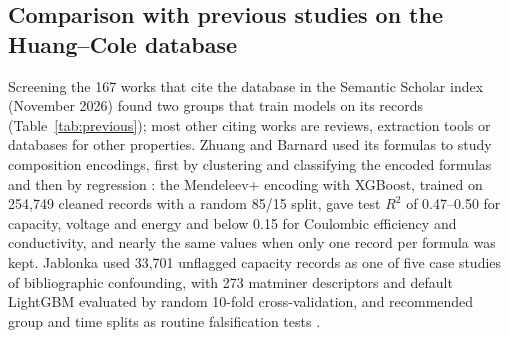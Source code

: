 \documentclass[journal=jcisd8,manuscript=article,layout=traditional]{achemso}
\begin{document}
\subsection{Comparison with previous studies on the Huang--Cole database}
\label{sec:previous}

Screening the 167 works that cite the database in the Semantic Scholar index (November 2026) found two groups that train models on its records (Table~\ref{tab:previous}); most other citing works are reviews, extraction tools or databases for other properties. Zhuang and Barnard used its formulas to study composition encodings, first by clustering and classifying the encoded formulas \cite{zhuang2023mendeleev,zhuang2024classification,zhuang2025applications} and then by regression \cite{zhuang2024property}: the Mendeleev+ encoding with XGBoost, trained on 254,749 cleaned records with a random 85/15 split, gave test $R^2$ of 0.47--0.50 for capacity, voltage and energy and below 0.15 for Coulombic efficiency and conductivity, and nearly the same values when only one record per formula was kept. Jablonka used 33,701 unflagged capacity records as one of five case studies of bibliographic confounding, with 273 matminer descriptors \cite{ward2018matminer,ward2016magpie,meredig2014combinatorial} and default LightGBM \cite{ke2017lightgbm} evaluated by random 10-fold cross-validation, and recommended group and time splits as routine falsification tests \cite{jablonka2026clever}.
\end{document}
